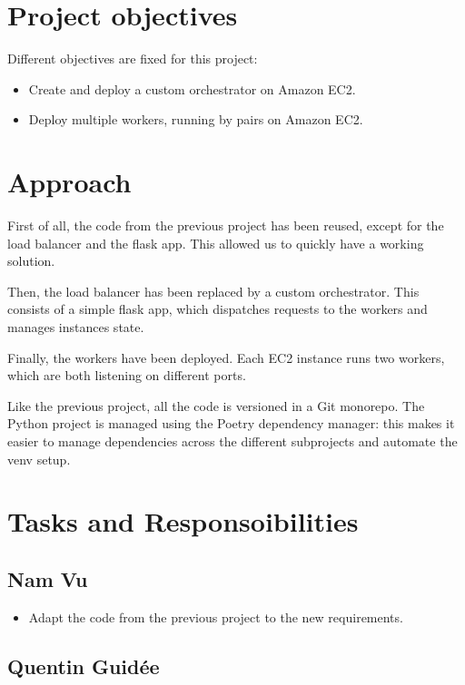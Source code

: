 \documentclass[letterpaper,headings=standardclasses,parskip=half]{scrartcl}
\begin{document}
\section{Project objectives}

Different objectives are fixed for this project:
\begin{itemize}
    \item Create and deploy a custom orchestrator on Amazon EC2.
    \item Deploy multiple workers, running by pairs on Amazon EC2.
\end{itemize}

\section{Approach}

First of all, the code from the previous project has been reused, except for the load balancer and the flask app.
This allowed us to quickly have a working solution.

Then, the load balancer has been replaced by a custom orchestrator. This consists of a simple flask app, which dispatches requests to the workers and manages instances state.

Finally, the workers have been deployed. Each EC2 instance runs two workers, which are both listening on different ports.

Like the previous project, all the code is versioned in a Git monorepo. The Python project is managed using the Poetry dependency manager: this makes it easier to manage dependencies across the different subprojects and automate the venv setup.

\section{Tasks and Responsoibilities}

\subsection*{Nam Vu}

\begin{itemize}
    \item Adapt the code from the previous project to the new requirements.
\end{itemize}

\subsection*{Quentin Guidée}
\end{document}
